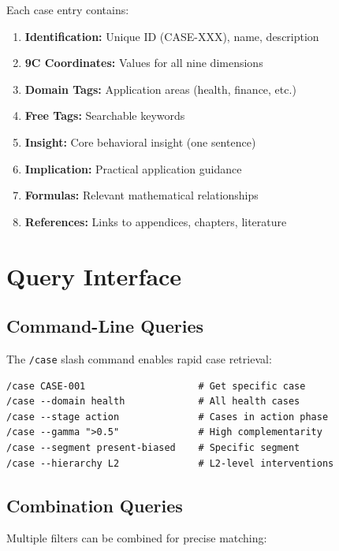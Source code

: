 Each case entry contains:

\begin{enumerate}
    \item \textbf{Identification:} Unique ID (CASE-XXX), name, description
    \item \textbf{9C Coordinates:} Values for all nine dimensions
    \item \textbf{Domain Tags:} Application areas (health, finance, etc.)
    \item \textbf{Free Tags:} Searchable keywords
    \item \textbf{Insight:} Core behavioral insight (one sentence)
    \item \textbf{Implication:} Practical application guidance
    \item \textbf{Formulas:} Relevant mathematical relationships
    \item \textbf{References:} Links to appendices, chapters, literature
\end{enumerate}

\section{Query Interface}

\subsection{Command-Line Queries}

The \texttt{/case} slash command enables rapid case retrieval:

\begin{verbatim}
/case CASE-001                    # Get specific case
/case --domain health             # All health cases
/case --stage action              # Cases in action phase
/case --gamma ">0.5"              # High complementarity
/case --segment present-biased    # Specific segment
/case --hierarchy L2              # L2-level interventions
\end{verbatim}

\subsection{Combination Queries}

Multiple filters can be combined for precise matching:

